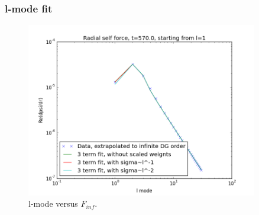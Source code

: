 \documentclass{beamer}
\begin{document}
\begin{frame}
  \frametitle{l-mode fit}
  \begin{figure}
    \includegraphics[width=0.9\textwidth]{fiterrscalecorrect3term570l1}
    \caption{l-mode versus $F_{inf}$.}
  \end{figure}
\end{frame}
\end{document}
